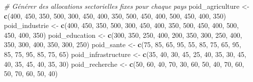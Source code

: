 \documentclass[
]{article}
\newenvironment{Shaded}{\begin{snugshade}}{\end{snugshade}}
\newcommand{\CommentTok}[1]{\textcolor[rgb]{0.56,0.35,0.01}{\textit{#1}}}
\newcommand{\DecValTok}[1]{\textcolor[rgb]{0.00,0.00,0.81}{#1}}
\newcommand{\FunctionTok}[1]{\textcolor[rgb]{0.13,0.29,0.53}{\textbf{#1}}}
\newcommand{\NormalTok}[1]{#1}
\newcommand{\OtherTok}[1]{\textcolor[rgb]{0.56,0.35,0.01}{#1}}
\begin{document}
\begin{Shaded}
\begin{Highlighting}[]
\CommentTok{\# Générer des allocations sectorielles fixes pour chaque pays}
\NormalTok{poid\_agriculture }\OtherTok{\textless{}{-}} \FunctionTok{c}\NormalTok{(}\DecValTok{400}\NormalTok{, }\DecValTok{450}\NormalTok{, }\DecValTok{350}\NormalTok{, }\DecValTok{500}\NormalTok{, }\DecValTok{300}\NormalTok{, }\DecValTok{450}\NormalTok{, }\DecValTok{400}\NormalTok{, }\DecValTok{350}\NormalTok{, }\DecValTok{500}\NormalTok{, }\DecValTok{450}\NormalTok{, }\DecValTok{400}\NormalTok{, }\DecValTok{500}\NormalTok{, }\DecValTok{450}\NormalTok{, }\DecValTok{400}\NormalTok{, }\DecValTok{350}\NormalTok{)}
\NormalTok{poid\_industrie }\OtherTok{\textless{}{-}} \FunctionTok{c}\NormalTok{(}\DecValTok{400}\NormalTok{, }\DecValTok{450}\NormalTok{, }\DecValTok{350}\NormalTok{, }\DecValTok{500}\NormalTok{, }\DecValTok{300}\NormalTok{, }\DecValTok{450}\NormalTok{, }\DecValTok{400}\NormalTok{, }\DecValTok{350}\NormalTok{, }\DecValTok{500}\NormalTok{, }\DecValTok{450}\NormalTok{, }\DecValTok{400}\NormalTok{, }\DecValTok{500}\NormalTok{, }\DecValTok{450}\NormalTok{, }\DecValTok{400}\NormalTok{, }\DecValTok{350}\NormalTok{)}
\NormalTok{poid\_education }\OtherTok{\textless{}{-}} \FunctionTok{c}\NormalTok{(}\DecValTok{300}\NormalTok{, }\DecValTok{350}\NormalTok{, }\DecValTok{250}\NormalTok{, }\DecValTok{400}\NormalTok{, }\DecValTok{200}\NormalTok{, }\DecValTok{350}\NormalTok{, }\DecValTok{300}\NormalTok{, }\DecValTok{250}\NormalTok{, }\DecValTok{400}\NormalTok{, }\DecValTok{350}\NormalTok{, }\DecValTok{300}\NormalTok{, }\DecValTok{400}\NormalTok{, }\DecValTok{350}\NormalTok{, }\DecValTok{300}\NormalTok{, }\DecValTok{250}\NormalTok{)}
\NormalTok{poid\_sante }\OtherTok{\textless{}{-}} \FunctionTok{c}\NormalTok{(}\DecValTok{75}\NormalTok{, }\DecValTok{85}\NormalTok{, }\DecValTok{65}\NormalTok{, }\DecValTok{95}\NormalTok{, }\DecValTok{55}\NormalTok{, }\DecValTok{85}\NormalTok{, }\DecValTok{75}\NormalTok{, }\DecValTok{65}\NormalTok{, }\DecValTok{95}\NormalTok{, }\DecValTok{85}\NormalTok{, }\DecValTok{75}\NormalTok{, }\DecValTok{95}\NormalTok{, }\DecValTok{85}\NormalTok{, }\DecValTok{75}\NormalTok{, }\DecValTok{65}\NormalTok{)}
\NormalTok{poid\_infrastructure }\OtherTok{\textless{}{-}} \FunctionTok{c}\NormalTok{(}\DecValTok{35}\NormalTok{, }\DecValTok{40}\NormalTok{, }\DecValTok{30}\NormalTok{, }\DecValTok{45}\NormalTok{, }\DecValTok{25}\NormalTok{, }\DecValTok{40}\NormalTok{, }\DecValTok{35}\NormalTok{, }\DecValTok{30}\NormalTok{, }\DecValTok{45}\NormalTok{, }\DecValTok{40}\NormalTok{, }\DecValTok{35}\NormalTok{, }\DecValTok{45}\NormalTok{, }\DecValTok{40}\NormalTok{, }\DecValTok{35}\NormalTok{, }\DecValTok{30}\NormalTok{)}
\NormalTok{poid\_recherche }\OtherTok{\textless{}{-}} \FunctionTok{c}\NormalTok{(}\DecValTok{50}\NormalTok{, }\DecValTok{60}\NormalTok{, }\DecValTok{40}\NormalTok{, }\DecValTok{70}\NormalTok{, }\DecValTok{30}\NormalTok{, }\DecValTok{60}\NormalTok{, }\DecValTok{50}\NormalTok{, }\DecValTok{40}\NormalTok{, }\DecValTok{70}\NormalTok{, }\DecValTok{60}\NormalTok{, }\DecValTok{50}\NormalTok{, }\DecValTok{70}\NormalTok{, }\DecValTok{60}\NormalTok{, }\DecValTok{50}\NormalTok{, }\DecValTok{40}\NormalTok{)}


\end{Highlighting}
\end{Shaded}
\end{document}
